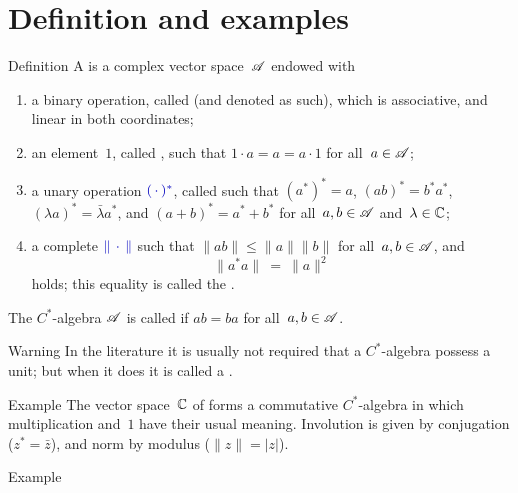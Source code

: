 \documentclass[a]{subfiles}
\begin{document}
\section{Definition and examples}
\begin{parsec}
\begin{point}{Definition}
A 
is a complex vector space~$\mathscr{A}$
endowed with
\begin{enumerate}
\item
a binary operation,
called 
(and denoted as such),
which is associative, and linear in both coordinates;
\item
an element~$1$, called 
,
such that $1\cdot a = a = a\cdot 1$
for all~$a\in \mathscr{A}$;
\item
a unary operation $\Define{(\,\cdot\,)^*}$,
called  %
%
such that $(a^*)^*=a$,
$(ab)^*=b^*a^*$,
$(\lambda a)^* = \bar\lambda a^*$,
and $(a+b)^* = a^*+b^*$
for all~$a,b\in\mathscr{A}$ and~$\lambda\in \mathbb{C}$;
\item
a complete %
$\Define{\|\,\cdot\,\|}$
such that
$\|ab\|\leq\|a\|\|b\|$
for all~$a,b\in\mathscr{A}$,
and 
\begin{equation*}
\label{eq:Cstar-identity}
\|a^*a\|\ =\ \|a\|^2
\end{equation*}
holds; this equality is called the .%
\end{enumerate}
The $C^*$-algebra $\mathscr{A}$ is called %
if $ab=ba$ for all~$a,b\in\mathscr{A}$.
\begin{point}{Warning}%
In the literature it is usually not
required that a $C^*$-algebra
possess a unit; but when it does it is called
a .%
\end{point}
\end{point}
\begin{point}{Example}%
The vector space~$\mathbb{C}$ of %
forms a commutative  $C^*$-algebra
in which
multiplication and~$1$
have their usual meaning.
Involution is given by conjugation ($z^*=\bar{z}$),
and norm by modulus ($\|z\|=|z|$).
\end{point}
\begin{point}{Example}%

\end{point}
\end{parsec}
\end{document}
